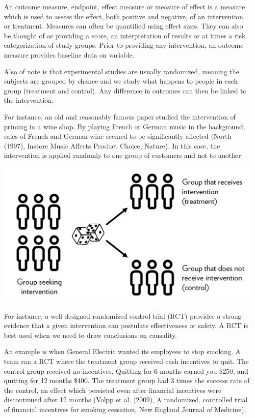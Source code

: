 \documentclass[openany]{book}
\begin{document}
An outcome measure, endpoint, effect measure or measure of effect is a measure which is used to assess the effect, both positive and negative, of an intervention or treatment. Measures can often be quantified using effect sizes. They can also be thought of as providing a score, an interpretation of results or at times a risk categorization of study groups. Prior to providing any intervention, an outcome measure provides baseline data on variable.

Also of note is that experimental studies are usually randomized, meaning the subjects are grouped by chance and we study what happens to people in each group (treatment and control). Any difference in outcomes can then be linked to the intervention.

For instance, an old and reasonably famous paper studied the intervention of priming in a wine shop. By playing French or German music in the background, sales of French and German wine seemed to be significantly affected (North (1997), Instore Music Affects Product Choice, Nature). In this case, the intervention is applied randomly to one group of customers and not to another.

\includegraphics{fig/RCT-graphic.png}

For instance, a well designed randomized control trial (RCT) provides a strong evidence that a given intervention can postulate effectiveness or safety. A RCT is best used when we need to draw conclusions on causality.

An example is when General Electric wanted its employees to stop smoking. A team ran a RCT where the treatment group received cash incentives to quit. The control group received no incentives.
Quitting for 6 months earned you \$250, and quitting for 12 months \$400. The treatment group had 3 times the success rate of the control, an effect which persisted even after financial incentives were
discontinued after 12 months (Volpp et al. (2009), A randomized, controlled trial of financial incentives for smoking cessation, New England Journal of Medicine).
\end{document}
